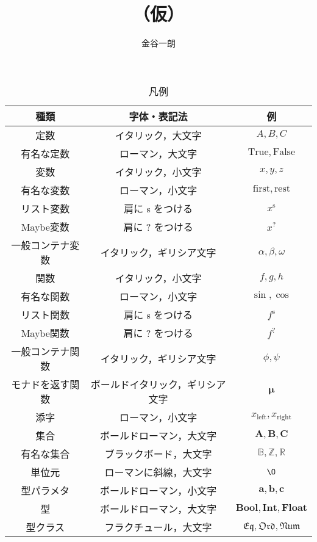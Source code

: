 \documentclass[a4paper,draft]{jsbook}
\title{\haskell （仮）}
\author{金谷一朗}
\newcommand{\mSpecialConst}[1]{\mathrm{#1}} %
\newcommand{\mTrue}{\mSpecialConst{True}}
\newcommand{\mFalse}{\mSpecialConst{False}}
\newcommand{\mZero}{\O}
\newcommand{\mSpecialVar}[1]{\mathrm{#1}} %
\newcommand{\mFirstVar}{\mSpecialVar{first}}
\newcommand{\mRestVar}{\mSpecialVar{rest}}
\newcommand{\mSpecialSub}[1]{\text{#1}}
\newcommand{\mLeft}{\mSpecialSub{left}}
\newcommand{\mRight}{\mSpecialSub{right}}
\newcommand{\mSet}[1]{\mathbf{#1}}
\newcommand{\mSpecialSet}[1]{\mathbb{#1}} %
\newcommand{\mRSet}{\mSpecialSet{R}}
\newcommand{\mZSet}{\mSpecialSet{Z}}
\newcommand{\mBSet}{\mSpecialSet{B}}
\newcommand{\mTypeParameter}[1]{\mathbf{#1}}
\newcommand{\mType}[1]{\mathbf{#1}}
\newcommand{\mBoolType}{\mType{Bool}}
\newcommand{\mIntType}{\mType{Int}}
\newcommand{\mFloatType}{\mType{Float}}
\newcommand{\mSpecialTypeClass}[1]{\mathfrak{#1}} %
\newcommand{\mEqTypeClass}{\mSpecialTypeClass{Eq}}
\newcommand{\mOrdTypeClass}{\mSpecialTypeClass{Ord}}
\newcommand{\mNumTypeClass}{\mSpecialTypeClass{Num}}
\newcommand{\mList}[1]{{#1}^\mathrm{s}}
\newcommand{\mMaybe}[1]{{#1}^\text{?}}
\newcommand{\mMonadFunc}[1]{{\boldsymbol#1}}
\newcommand{\mathVarKeyword}[1]{\operatorname{\mathrm{#1}}}
\newcommand{\mFirstVar}{\mathVarKeyword{first}}
\begin{document}
\setlength{\baselineskip}{17pt}
\maketitle
\tableofcontents

\begin{table*}
\caption{凡例}
\begin{center}
\begin{tabular}{||c|c|c||}
\hline
種類&字体・表記法&例\\
\hline\hline
定数&イタリック，大文字&$A,B,C$\\
有名な定数&ローマン，大文字&$\mTrue,\mFalse$\\
\hline
変数&イタリック，小文字&$x,y,z$\\
有名な変数&ローマン，小文字&$\mFirstVar,\mRestVar$\\
リスト変数&肩に s をつける&$\mList{x}$\\
Maybe変数&肩に ? をつける&$\mMaybe{x}$\\
一般コンテナ変数&イタリック，ギリシア文字&$\alpha,\beta,\omega$\\
\hline
関数&イタリック，小文字&$f,g,h$\\
有名な関数&ローマン，小文字&$\sin,\cos$\\
リスト関数&肩に s をつける&$\mList{f}$\\
Maybe関数&肩に ? をつける&$\mMaybe{f}$\\
一般コンテナ関数&イタリック，ギリシア文字&$\phi,\psi$\\
モナドを返す関数&ボールドイタリック，ギリシア文字&$\mMonadFunc{\mu}$\\
\hline
添字&ローマン，小文字&$x_\mLeft,x_\mRight$\\
\hline
集合&ボールドローマン，大文字&$\mSet{A},\mSet{B},\mSet{C}$\\
有名な集合&ブラックボード，大文字&$\mBSet,\mZSet,\mRSet$\\
単位元&ローマンに斜線，大文字&$\mZero$\\
\hline
型パラメタ&ボールドローマン，小文字&$\mTypeParameter{a},\mTypeParameter{b},\mTypeParameter{c}$\\
型&ボールドローマン，大文字&$\mBoolType,\mIntType,\mFloatType$\\
型クラス&フラクチュール，大文字&$\mEqTypeClass,\mOrdTypeClass,\mNumTypeClass$\\
\hline

\end{tabular}
\end{center}
\end{table*}
\end{document}
